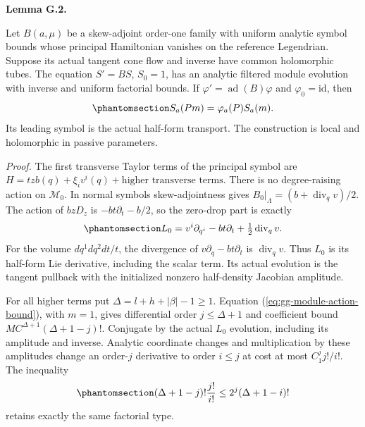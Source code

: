 \documentclass[
  english,
  11pt,
  reqno]{amsart}
\makeatletter
\newcommand{\pandocstatementheading}[1]{%
  \par\addpenalty{\@beginparpenalty}%
  \addvspace{.5\baselineskip plus .2\baselineskip minus .2\baselineskip}%
  {\normalfont\bfseries #1\par}%
  \nobreak\@afterindenttrue\@afterheading
}
\makeatother
\begin{document}
\pandocstatementheading{\protect{}\label{lem:gg-module-tangent-transport}Lemma G.2.}

Let \(B(a,\mu)\) be a skew-adjoint order-one family with uniform
analytic symbol bounds whose principal Hamiltonian vanishes on the
reference Legendrian. Suppose its actual tangent cone flow and inverse
have common holomorphic tubes. The equation \(S'=BS\), \(S_0=1\), has an
analytic filtered module evolution with inverse and uniform factorial
bounds. If \(\varphi'=\operatorname{ad}(B)\varphi\) and
\(\varphi_0=\mathrm{id}\), then
\begin{equation}\protect\phantomsection\label{eq:gg-module-transport-semilinearity}{
 S_a(Pm)=\varphi_a(P)S_a(m).
}\end{equation} Its leading symbol is the actual half-form transport.
The construction is local and holomorphic in passive parameters.

\emph{Proof.} The first transverse Taylor terms of the principal symbol
are \(H=tzb(q)+\xi_i v^i(q)+\text{higher transverse terms}\). There is
no degree-raising action on \(\mathcal M_0\). In normal symbols
skew-adjointness gives \(B_0|_\Lambda=(b+\operatorname{div}_qv)/2\). The
action of \(bzD_z\) is \(-bt\partial_t-b/2\), so the zero-drop part is
exactly
\begin{equation}\protect\phantomsection\label{eq:gg-module-leading-lie-transport}{
 L_0=v^i\partial_{q^i}-bt\partial_t+
                         \tfrac12\operatorname{div}_qv .
}\end{equation} For the volume \(dq^1dq^2dt/t\), the divergence of
\(v\partial_q-bt\partial_t\) is \(\operatorname{div}_qv\). Thus \(L_0\)
is its half-form Lie derivative, including the scalar term. Its actual
evolution is the tangent pullback with the initialized nonzero
half-density Jacobian amplitude.

For all higher terms put \(\Delta=l+h+|\beta|-1\ge1\). Equation
(\ref{eq:gg-module-action-bound}), with \(m=1\), gives differential
order \(j\le\Delta+1\) and coefficient bound
\(MC^{\Delta+1}(\Delta+1-j)!\). Conjugate by the actual \(L_0\)
evolution, including its amplitude and inverse. Analytic coordinate
changes and multiplication by these amplitudes change an order-\(j\)
derivative to order \(i\le j\) at cost at most \(C_1^j j!/i!\). The
inequality
\begin{equation}\protect\phantomsection\label{eq:gg-module-conjugated-action-bound}{
 (\Delta+1-j)!\frac{j!}{i!}
 \le 2^j(\Delta+1-i)!
}\end{equation} retains exactly the same factorial type.
\end{document}
